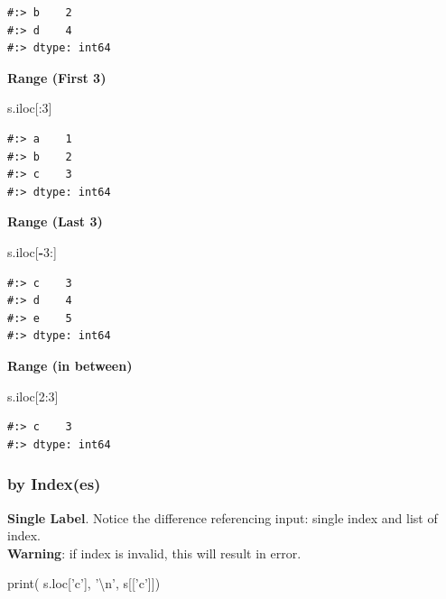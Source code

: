 \documentclass[
]{book}
\newenvironment{Shaded}{\begin{snugshade}}{\end{snugshade}}
\newcommand{\BuiltInTok}[1]{#1}
\newcommand{\CharTok}[1]{\textcolor[rgb]{0.5,0.5,0.5}{#1}}
\newcommand{\DecValTok}[1]{\textcolor[rgb]{0.06,0.06,0.06}{#1}}
\newcommand{\NormalTok}[1]{#1}
\newcommand{\OperatorTok}[1]{\textcolor[rgb]{0.43,0.43,0.43}{\textbf{#1}}}
\newcommand{\StringTok}[1]{\textcolor[rgb]{0.5,0.5,0.5}{#1}}
\begin{document}
\begin{verbatim}
#:> b    2
#:> d    4
#:> dtype: int64
\end{verbatim}

\textbf{Range (First 3)}

\begin{Shaded}
\begin{Highlighting}[]
\NormalTok{s.iloc[:}\DecValTok{3}\NormalTok{]}
\end{Highlighting}
\end{Shaded}

\begin{verbatim}
#:> a    1
#:> b    2
#:> c    3
#:> dtype: int64
\end{verbatim}

\textbf{Range (Last 3)}

\begin{Shaded}
\begin{Highlighting}[]
\NormalTok{s.iloc[}\OperatorTok{-}\DecValTok{3}\NormalTok{:]}
\end{Highlighting}
\end{Shaded}

\begin{verbatim}
#:> c    3
#:> d    4
#:> e    5
#:> dtype: int64
\end{verbatim}

\textbf{Range (in between)}

\begin{Shaded}
\begin{Highlighting}[]
\NormalTok{s.iloc[}\DecValTok{2}\NormalTok{:}\DecValTok{3}\NormalTok{]}
\end{Highlighting}
\end{Shaded}

\begin{verbatim}
#:> c    3
#:> dtype: int64
\end{verbatim}

\hypertarget{by-indexes}{%
\subsubsection{by Index(es)}\label{by-indexes}}

\textbf{Single Label}. Notice the difference referencing input: single index and list of index.\\
\textbf{Warning}: if index is invalid, this will result in error.

\begin{Shaded}
\begin{Highlighting}[]
\BuiltInTok{print}\NormalTok{( s.loc[}\StringTok{'c'}\NormalTok{], }\StringTok{'}\CharTok{\textbackslash{}n}\StringTok{'}\NormalTok{,}
\NormalTok{       s[[}\StringTok{'c'}\NormalTok{]])}
\end{Highlighting}
\end{Shaded}
\end{document}
